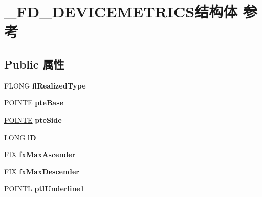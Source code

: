 \hypertarget{struct___f_d___d_e_v_i_c_e_m_e_t_r_i_c_s}{}\section{\+\_\+\+F\+D\+\_\+\+D\+E\+V\+I\+C\+E\+M\+E\+T\+R\+I\+C\+S结构体 参考}
\label{struct___f_d___d_e_v_i_c_e_m_e_t_r_i_c_s}
\subsection*{Public 属性}
\begin{DoxyCompactItemize}
\item 
\mbox{\label{struct___f_d___d_e_v_i_c_e_m_e_t_r_i_c_s_a288c1af589cf661ecacb913b3d8aeb70}} 
F\+L\+O\+NG {\bfseries fl\+Realized\+Type}
\item 
\mbox{\label{struct___f_d___d_e_v_i_c_e_m_e_t_r_i_c_s_ab689f752270f1c84e425838cfbee4128}} 
\hyperlink{struct___p_o_i_n_t_e}{P\+O\+I\+N\+TE} {\bfseries pte\+Base}
\item 
\mbox{\label{struct___f_d___d_e_v_i_c_e_m_e_t_r_i_c_s_a2eb0b58f47639bcc33d96a0e87602fbb}} 
\hyperlink{struct___p_o_i_n_t_e}{P\+O\+I\+N\+TE} {\bfseries pte\+Side}
\item 
\mbox{\label{struct___f_d___d_e_v_i_c_e_m_e_t_r_i_c_s_ae28405f229d90b80700fc8243fef17cd}} 
L\+O\+NG {\bfseries lD}
\item 
\mbox{\label{struct___f_d___d_e_v_i_c_e_m_e_t_r_i_c_s_a1ca4b49fb053ed17dc0d3133f497c229}} 
F\+IX {\bfseries fx\+Max\+Ascender}
\item 
\mbox{\label{struct___f_d___d_e_v_i_c_e_m_e_t_r_i_c_s_a91746e864fc6caaa9e78e41f3759df02}} 
F\+IX {\bfseries fx\+Max\+Descender}
\item 
\mbox{\label{struct___f_d___d_e_v_i_c_e_m_e_t_r_i_c_s_a60e3acf649fb177a1f848b060323d8c9}} 
\hyperlink{struct___p_o_i_n_t_l}{P\+O\+I\+N\+TL} {\bfseries ptl\+Underline1}

\end{DoxyCompactItemize}
